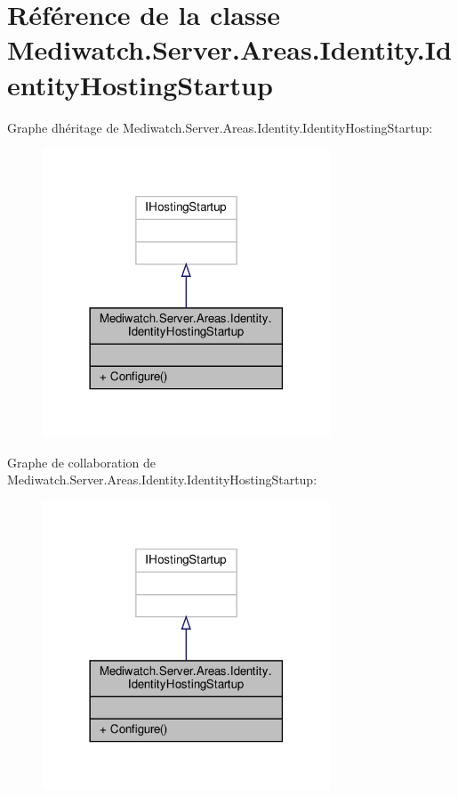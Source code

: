 \hypertarget{class_mediwatch_1_1_server_1_1_areas_1_1_identity_1_1_identity_hosting_startup}{}\section{Référence de la classe Mediwatch.\+Server.\+Areas.\+Identity.\+Identity\+Hosting\+Startup}
\label{class_mediwatch_1_1_server_1_1_areas_1_1_identity_1_1_identity_hosting_startup}


Graphe d\textquotesingle{}héritage de Mediwatch.\+Server.\+Areas.\+Identity.\+Identity\+Hosting\+Startup\+:\nopagebreak
\begin{figure}[H]
\begin{center}
\leavevmode
\includegraphics[width=242pt]{class_mediwatch_1_1_server_1_1_areas_1_1_identity_1_1_identity_hosting_startup__inherit__graph}
\end{center}
\end{figure}


Graphe de collaboration de Mediwatch.\+Server.\+Areas.\+Identity.\+Identity\+Hosting\+Startup\+:\nopagebreak
\begin{figure}[H]
\begin{center}
\leavevmode
\includegraphics[width=242pt]{class_mediwatch_1_1_server_1_1_areas_1_1_identity_1_1_identity_hosting_startup__coll__graph}
\end{center}
\end{figure}
